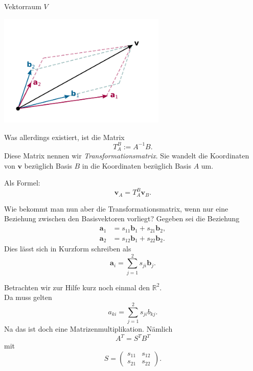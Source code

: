 \documentclass{beamer}
\newcommand{\bv}[1]{\mathbf{#1}}
\newcommand{\R}{\mathbb R}
\begin{document}
\begin{frame}
\begin{center}Vektorraum $V$\end{center}

\vspace{-2em}
\begin{center}
\includegraphics[width=80mm]{img/Abstrakt-in-Basis-BA.pdf}
\end{center}
\end{frame}

\begin{frame}
Was allerdings existiert, ist die Matrix
\[T_A^B := A^{-1}B.\]\pause
Diese Matrix nennen wir \emph{Transformationsmatrix}. Sie wandelt die
Koordinaten von $\bv v$ bezüglich Basis $B$ in die Koordinaten
bezüglich Basis $A$ um.\pause

\vspace{0.8em}
Als Formel:
\[\bv v_A = T_A^B \bv v_B.\]
\end{frame}

\begin{frame}
Wie bekommt man nun aber die Transformationsmatrix, wenn nur
eine Beziehung zwischen den Basisvektoren vorliegt? Gegeben sei
die Beziehung
\begin{align*}
\bv a_1 &= s_{11}\bv b_1 + s_{21}\bv b_2,\\
\bv a_2 &= s_{12}\bv b_1 + s_{22}\bv b_2.
\end{align*}\pause
Dies lässt sich in Kurzform schreiben als
\[\bv a_i = \sum_{j=1}^2 s_{ji}\bv b_j.\]
\end{frame}

\begin{frame}
Betrachten wir zur Hilfe kurz noch einmal den $\R^2$.\\
Da muss gelten
\[a_{ki} = \sum_{j=1}^2 s_{ji}b_{kj}.\]\pause
Na das ist doch eine Matrizenmultiplikation. Nämlich
\[A^T = S^T B^T\]
mit
\[S = \begin{pmatrix}s_{11} & s_{12}\\
s_{21} & s_{22}\end{pmatrix}.\]
\end{frame}
\end{document}
